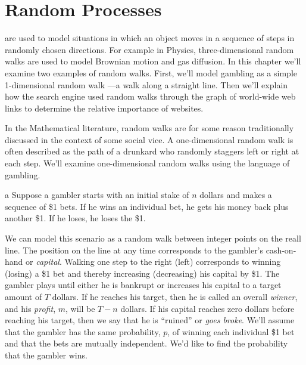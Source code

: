 \chapter{Random Processes}\label{ran_process_chap}

 are used to model situations in which an object moves
in a sequence of steps in randomly chosen directions.  For example in
Physics, three-dimensional random walks are used to model Brownian motion
and gas diffusion.  In this chapter we'll examine two examples of random
walks.  First, we'll model gambling as a simple 1-dimensional random walk
---a walk along a straight line.  Then we'll explain how the 
search engine used random walks through the graph of world-wide web links
to determine the relative importance of websites.



\begin{staffnotes}
In the Mathematical literature, random walks are for some reason
traditionally discussed in the context of some social vice.  A
one-dimensional random walk is often described as the path of a drunkard
who randomly staggers left or right at each step.  We'll examine
one-dimensional random walks using the language of gambling.
\end{staffnotes}
a
Suppose a gambler starts with an initial stake of $n$ dollars and makes a
sequence of \$1 bets.  If he wins an individual bet, he gets his money
back plus another \$1.  If he loses, he loses the \$1.  

We can model this scenario as a random walk between integer points on
the reall line.  The position on the line at any time corresponds to
the gambler's cash-on-hand or \emph{capital}.  Walking one step to the
right (left) corresponds to winning (losing) a \$1 bet and thereby
increasing (decreasing) his capital by \$1.  The gambler plays until
either he is bankrupt or increases his capital to a target amount of
$T$ dollars.  If he reaches his target, then he is called an overall
\emph{winner}, and his \emph{profit}, $m$, will be $T-n$ dollars.  If
his capital reaches zero dollars before reaching his target, then we
say that he is ``ruined'' or \emph{goes broke}.  We'll assume that the
gambler has the same probability, $p$, of winning each individual \$1
bet and that the bets are mutually independent.  We'd like to find the
probability that the gambler wins.

